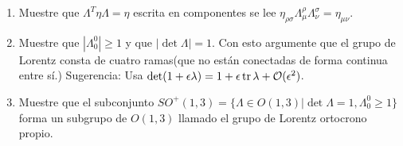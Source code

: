 \documentclass[../main]{subfiles}
\begin{document}
\begin{enumerate}
\begin{enumerate}
        \item Muestre que $\Lambda^T \eta \Lambda=\eta$ escrita en componentes se lee $\eta_{\rho\sigma}\Lambda^{\rho}_{\mu}\Lambda^{\sigma}_{\nu}=\eta_{\mu\nu}$.
        \item Muestre que $|\Lambda^0_0|\geq 1$ y que $|\det \Lambda|=1$. Con esto argumente que el grupo de Lorentz consta de cuatro ramas(que no están conectadas de forma continua entre sí.) Sugerencia: Usa $\det (1+\epsilon\lambda)=1+\epsilon \tr \lambda+\mathcal{O}(\epsilon^2)$.
        \item Muestre que el subconjunto $SO^+(1, 3)=\{\Lambda \in O(1, 3)| \det \Lambda =1, \Lambda^0_0\geq 1\}$ forma un subgrupo de $O(1, 3)$ llamado el grupo de Lorentz ortocrono propio.
    \end{enumerate}
\end{enumerate}
\end{document}
